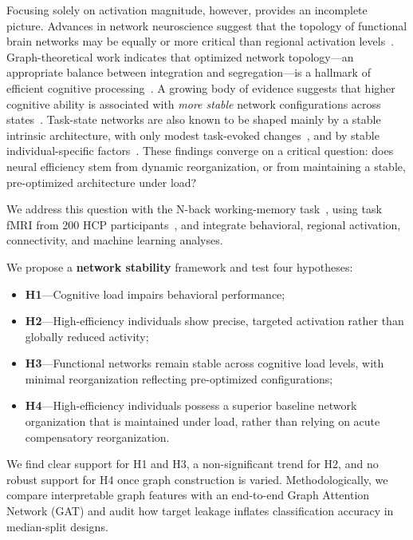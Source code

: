 \documentclass[conference]{IEEEtran}
\begin{document}
Focusing solely on activation magnitude, however, provides an incomplete picture. Advances in network neuroscience suggest that the topology of functional brain networks may be equally or more critical than regional activation levels~\cite{bassett2017network,bullmore2012economy}. Graph-theoretical work indicates that optimized network topology---an appropriate balance between integration and segregation---is a hallmark of efficient cognitive processing~\cite{sporns2016modular}. A growing body of evidence suggests that higher cognitive ability is associated with \emph{more stable} network configurations across states~\cite{shine2016dynamics,schultz2016higher}. Task-state networks are also known to be shaped mainly by a stable intrinsic architecture, with only modest task-evoked changes~\cite{cole2014intrinsic,cole2021functional}, and by stable individual-specific factors~\cite{gratton2018functional}. These findings converge on a critical question: does neural efficiency stem from dynamic reorganization, or from maintaining a stable, pre-optimized architecture under load?

We address this question with the N-back working-memory task~\cite{baddeley2012working,owen2005n}, using task fMRI from 200 HCP participants~\cite{van2013wu,barch2013function}, and integrate behavioral, regional activation, connectivity, and machine learning analyses.

We propose a \textbf{network stability} framework and test four hypotheses:
\begin{itemize}
  \item \textbf{H1}---Cognitive load impairs behavioral performance;
  \item \textbf{H2}---High-efficiency individuals show precise, targeted activation rather than globally reduced activity;
  \item \textbf{H3}---Functional networks remain stable across cognitive load levels, with minimal reorganization reflecting pre-optimized configurations;
  \item \textbf{H4}---High-efficiency individuals possess a superior baseline network organization that is maintained under load, rather than relying on acute compensatory reorganization.
\end{itemize}
We find clear support for H1 and H3, a non-significant trend for H2, and no robust support for H4 once graph construction is varied. Methodologically, we compare interpretable graph features with an end-to-end Graph Attention Network (GAT) and audit how target leakage inflates classification accuracy in median-split designs.
\end{document}
